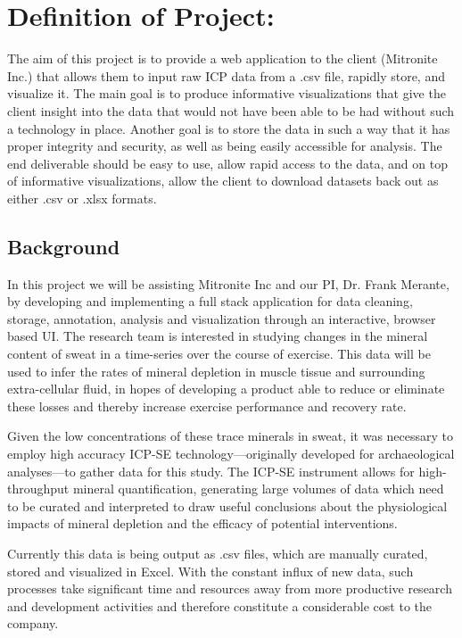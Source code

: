 \documentclass[10pt,twocolumn,letterpaper]{article}
\begin{document}
\section{Definition of Project:}
		
		The aim of this project is to provide a web application to the client (Mitronite Inc.) that allows them to input raw ICP data from a .csv file, rapidly store, and
		visualize it.
		The main goal is to produce informative visualizations that give the client insight into the data that would not have been able to be had without such a technology in
		place.
		Another goal is to store the data in such a way that it has proper integrity and security, as well as being easily accessible for analysis.
		The end deliverable should be easy to use, allow rapid access to the data, and on top of informative visualizations, allow the client to download datasets back out as
		either .csv or .xlsx formats.
		
            \subsection{Background}

            In this project we will be assisting Mitronite Inc and our PI, Dr. Frank Merante, by developing and implementing a full stack application for data cleaning, storage,
	    annotation, analysis and visualization through an interactive, browser based UI.
	    The research team is interested in studying changes in the mineral content of sweat in a time-series over the course of exercise. This data will be used to infer the
	    rates of mineral depletion in muscle tissue and surrounding extra-cellular fluid, in hopes of developing a product able to reduce or eliminate these losses and
	    thereby increase exercise performance and recovery rate.

            Given the low concentrations of these trace minerals in sweat, it was necessary to employ high accuracy ICP-SE technology---originally developed for archaeological analyses---to gather data for this study. The ICP-SE instrument allows for high-throughput mineral quantification, generating large volumes of data which need to be curated and interpreted to draw useful conclusions about the physiological impacts of mineral depletion and the efficacy of potential interventions.

            Currently this data is being output as .csv files, which are manually curated, stored and visualized in Excel. With the constant influx of new data, such processes take significant time and resources away from more productive research and development activities and therefore constitute a considerable cost to the company.
\end{document}
